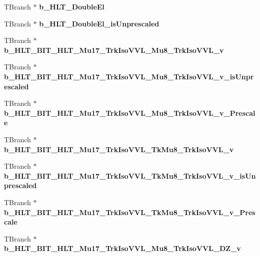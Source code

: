 \begin{DoxyCompactItemize}
T\+Branch $\ast$ {\bfseries b\+\_\+\+H\+L\+T\+\_\+\+Double\+El}
\item 
\hypertarget{classMiniTree_a389b9e7905b4397042e283b6bf730d6a}{}\label{classMiniTree_a389b9e7905b4397042e283b6bf730d6a} 
T\+Branch $\ast$ {\bfseries b\+\_\+\+H\+L\+T\+\_\+\+Double\+El\+\_\+is\+Unprescaled}
\item 
\hypertarget{classMiniTree_ab916db4b6670aadaf5a840fefd8afc4d}{}\label{classMiniTree_ab916db4b6670aadaf5a840fefd8afc4d} 
T\+Branch $\ast$ {\bfseries b\+\_\+\+H\+L\+T\+\_\+\+B\+I\+T\+\_\+\+H\+L\+T\+\_\+\+Mu17\+\_\+\+Trk\+Iso\+V\+V\+L\+\_\+\+Mu8\+\_\+\+Trk\+Iso\+V\+V\+L\+\_\+v}
\item 
\hypertarget{classMiniTree_a0f67f4b2eef8900168bcd223b85436da}{}\label{classMiniTree_a0f67f4b2eef8900168bcd223b85436da} 
T\+Branch $\ast$ {\bfseries b\+\_\+\+H\+L\+T\+\_\+\+B\+I\+T\+\_\+\+H\+L\+T\+\_\+\+Mu17\+\_\+\+Trk\+Iso\+V\+V\+L\+\_\+\+Mu8\+\_\+\+Trk\+Iso\+V\+V\+L\+\_\+v\+\_\+is\+Unprescaled}
\item 
\hypertarget{classMiniTree_af02cc05d8e83be70cff3de8f85930d67}{}\label{classMiniTree_af02cc05d8e83be70cff3de8f85930d67} 
T\+Branch $\ast$ {\bfseries b\+\_\+\+H\+L\+T\+\_\+\+B\+I\+T\+\_\+\+H\+L\+T\+\_\+\+Mu17\+\_\+\+Trk\+Iso\+V\+V\+L\+\_\+\+Mu8\+\_\+\+Trk\+Iso\+V\+V\+L\+\_\+v\+\_\+\+Prescale}
\item 
\hypertarget{classMiniTree_a9549e619eab6f766a1f32441c3722e65}{}\label{classMiniTree_a9549e619eab6f766a1f32441c3722e65} 
T\+Branch $\ast$ {\bfseries b\+\_\+\+H\+L\+T\+\_\+\+B\+I\+T\+\_\+\+H\+L\+T\+\_\+\+Mu17\+\_\+\+Trk\+Iso\+V\+V\+L\+\_\+\+Tk\+Mu8\+\_\+\+Trk\+Iso\+V\+V\+L\+\_\+v}
\item 
\hypertarget{classMiniTree_a99969606e2120e482313036f70aa39c7}{}\label{classMiniTree_a99969606e2120e482313036f70aa39c7} 
T\+Branch $\ast$ {\bfseries b\+\_\+\+H\+L\+T\+\_\+\+B\+I\+T\+\_\+\+H\+L\+T\+\_\+\+Mu17\+\_\+\+Trk\+Iso\+V\+V\+L\+\_\+\+Tk\+Mu8\+\_\+\+Trk\+Iso\+V\+V\+L\+\_\+v\+\_\+is\+Unprescaled}
\item 
\hypertarget{classMiniTree_a3e8ca9e341a13b7af7e9680de25cbf04}{}\label{classMiniTree_a3e8ca9e341a13b7af7e9680de25cbf04} 
T\+Branch $\ast$ {\bfseries b\+\_\+\+H\+L\+T\+\_\+\+B\+I\+T\+\_\+\+H\+L\+T\+\_\+\+Mu17\+\_\+\+Trk\+Iso\+V\+V\+L\+\_\+\+Tk\+Mu8\+\_\+\+Trk\+Iso\+V\+V\+L\+\_\+v\+\_\+\+Prescale}
\item 
\hypertarget{classMiniTree_aea9c462f8cfbca899ab7c418764c1c33}{}\label{classMiniTree_aea9c462f8cfbca899ab7c418764c1c33} 
T\+Branch $\ast$ {\bfseries b\+\_\+\+H\+L\+T\+\_\+\+B\+I\+T\+\_\+\+H\+L\+T\+\_\+\+Mu17\+\_\+\+Trk\+Iso\+V\+V\+L\+\_\+\+Mu8\+\_\+\+Trk\+Iso\+V\+V\+L\+\_\+\+D\+Z\+\_\+v}

\end{DoxyCompactItemize}
